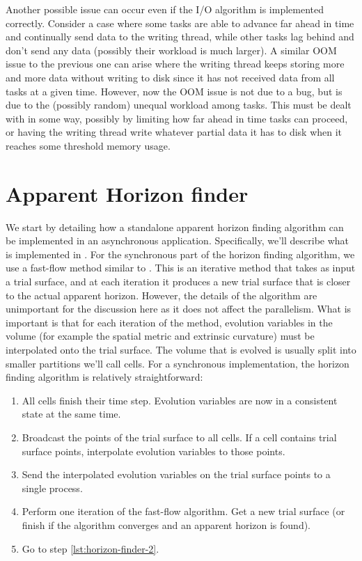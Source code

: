 \begin{bibunit}[unsrtnat]
Another possible issue can occur even if the I/O algorithm is implemented
correctly. Consider a case where some tasks are able to advance far ahead in time
and continually send data to the writing thread, while other tasks lag behind
and don't send any data (possibly their workload is much larger). A similar OOM
issue to the previous one can arise where the writing thread keeps storing more
and more data without writing to disk since it has not received data from all
tasks at a given time. However, now the OOM issue is not due to a bug, but is
due to the (possibly random) unequal workload among tasks. This must be dealt
with in some way, possibly by limiting how far ahead in time tasks can proceed,
or having the writing thread write whatever partial data it has to disk when it
reaches some threshold memory usage.

\section{Apparent Horizon finder\label{sec:horizon-finder}}

We start by detailing how a standalone apparent horizon finding algorithm can be
implemented in an asynchronous application. Specifically, we'll describe what is
implemented in \spectre. For the synchronous part of the horizon finding
algorithm, we use a fast-flow method similar to \cite{Gundlach:1997us}. This is
an iterative method that takes as input a trial surface, and at each iteration
it produces a new trial surface that is closer to the actual apparent horizon.
However, the details of the algorithm are unimportant for the discussion here as
it does not affect the parallelism. What is important is that for each iteration
of the method, evolution variables in the volume (for example the spatial metric
and extrinsic curvature) must be interpolated onto the trial surface. The volume
that is evolved is usually split into smaller partitions we'll call cells. For a
synchronous implementation, the horizon finding algorithm is relatively
straightforward:

\begin{enumerate}
\item \label{lst:horizon-finder-1} All cells finish their time step. Evolution
variables are now in a consistent state at the same time.
\item \label{lst:horizon-finder-2} Broadcast the points of the trial surface to
all cells. If a cell contains trial surface points, interpolate evolution
variables to those points.
\item Send the interpolated evolution variables on the trial surface points to
a single process.
\item Perform one iteration of the fast-flow algorithm. Get a new trial surface
(or finish if the algorithm converges and an apparent horizon is found).
\item Go to step \ref{lst:horizon-finder-2}.
\end{enumerate}


\end{bibunit}
